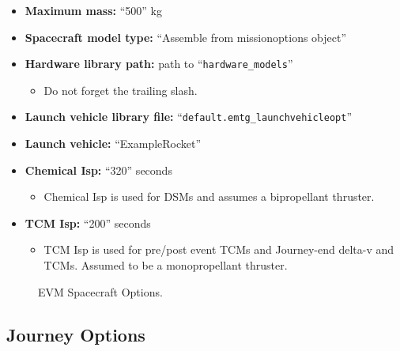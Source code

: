 \documentclass[11pt]{article}
\begin{document}
\begin{itemize}
	\item \textbf{Maximum mass:} ``500'' kg
	\item \textbf{Spacecraft model type:} ``Assemble from missionoptions object''
	\item \textbf{Hardware library path:} path to ``\texttt{hardware\_models}''
	\begin{itemize}
		\item Do not forget the trailing slash.
	\end{itemize}
	\item \textbf{Launch vehicle library file:} ``\texttt{default.emtg\_launchvehicleopt}''
	\item \textbf{Launch vehicle:} ``ExampleRocket''
	\item \textbf{Chemical Isp:} ``320'' seconds
	\begin{itemize}
		\item Chemical Isp is used for \ac{DSM}s and assumes a bipropellant thruster.
	\end{itemize}
	\item \textbf{TCM Isp:} ``200'' seconds
	\begin{itemize}
		\item TCM Isp is used for pre/post event TCMs and Journey-end delta-v and TCMs. Assumed to be a monopropellant thruster.
	\end{itemize}
\end{itemize}

\begin{figure}[H]
	\centering
	\caption{\label{fig:spacecraft_options}EVM Spacecraft Options.}
\end{figure}

\subsection{Journey Options}
\label{sec:journey_options}
\end{document}
